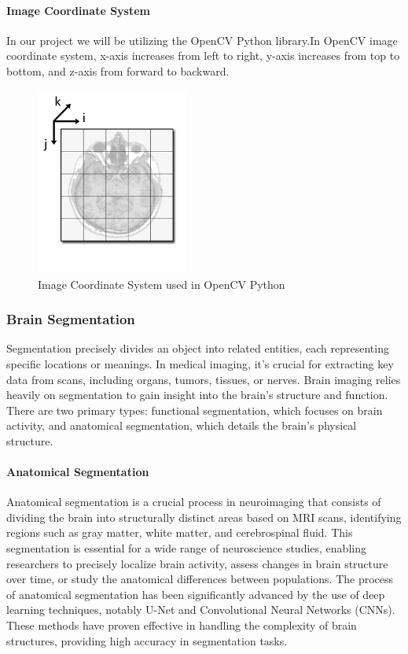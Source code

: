 \documentclass[12pt]{article}
\begin{document}
\paragraph*{Image Coordinate System}
In our project we will be utilizing the OpenCV Python library.In OpenCV image coordinate
system, x-axis increases from left to right, y-axis increases from top to bottom, and z-axis
from forward to backward.
\begin{figure}[hbpt!]
  \centering
  \includegraphics[width=50mm]{image-coordinate-system.png}
  \caption{Image Coordinate System used in OpenCV Python~\cite{SlicerWikiCoordinateSystems}}
  \label{imagecoordfMRI}
\end{figure}





\subsubsection{Brain Segmentation}
Segmentation precisely divides an object into related entities, each representing specific locations or meanings.
In medical imaging, it's crucial for extracting key data from scans, including organs, tumors, tissues, or nerves.
Brain imaging relies heavily on segmentation to gain insight into the brain's structure and function.
There are two primary types: functional segmentation, which focuses on brain activity, and anatomical segmentation, which details the brain's physical structure.

\paragraph*{Anatomical Segmentation}
Anatomical segmentation is a crucial process in neuroimaging that consists of dividing the brain into structurally distinct areas based on MRI scans,
identifying regions such as gray matter, white matter, and cerebrospinal fluid. This segmentation is essential for a wide range of neuroscience studies,
enabling researchers to precisely localize brain activity, assess changes in brain structure over time, or study the anatomical differences between populations.
The process of anatomical segmentation has been significantly advanced by the use of deep learning techniques, notably U-Net and Convolutional Neural Networks (CNNs).
These methods have proven effective in handling the complexity of brain structures, providing high accuracy in segmentation tasks.
\end{document}
